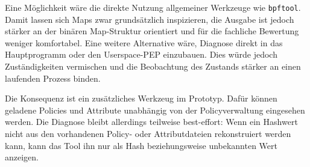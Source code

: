Eine Möglichkeit wäre die direkte Nutzung allgemeiner Werkzeuge wie \texttt{bpftool}.
Damit lassen sich Maps zwar grundsätzlich inspizieren, die Ausgabe ist jedoch stärker an der binären Map-Struktur orientiert und für die fachliche Bewertung weniger komfortabel.
Eine weitere Alternative wäre, Diagnose direkt in das Hauptprogramm oder den Userspace-PEP einzubauen.
Dies würde jedoch Zuständigkeiten vermischen und die Beobachtung des Zustands stärker an einen laufenden Prozess binden.

Die Konsequenz ist ein zusätzliches Werkzeug im Prototyp.
Dafür können geladene Policies und Attribute unabhängig von der Policyverwaltung eingesehen werden.
Die Diagnose bleibt allerdings teilweise best-effort: Wenn ein Hashwert nicht aus den vorhandenen Policy- oder Attributdateien rekonstruiert werden kann, kann das Tool ihn nur als Hash beziehungsweise unbekannten Wert anzeigen.

\newpage
